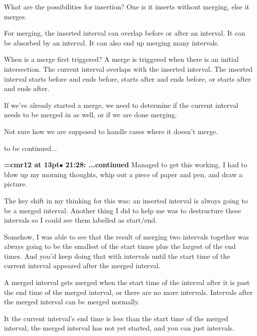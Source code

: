 What are the possibilities for insertion? One is it inserts without merging, else it merges.
\par

For merging, the inserted interval can overlap before or after an interval. It can be absorbed by an interval. It can also end up merging many intervals.
\par

When is a merge first triggered? A merge is triggered when there is an initial intersection. The current interval overlaps with the inserted interval. The inserted interval starts before and ends before, starts after and ends before, or starts after and ends after.
\par

If we've already started a merge, we need to determine if the current interval needs to be merged in as well, or if we are done merging.
\par

Not sure how we are supposed to handle cases where it doesn't merge.
\par

to be continued...
\par

{\smallskip\noindent\bf\font\titlefont=cmr12 at 13pt\titlefont $\bullet$ 21:28: ...continued}\smallskip
Managed to get this working. I had to blow up my morning thoughts, whip out a piece of paper and pen, and draw a picture.
\par

The key shift in my thinking for this was: an inserted interval is always going to be a merged interval. Another thing I did to help me was to destructure these intervals so I could see them labelled as start/end.
\par

Somehow, I was able to see that the result of merging two intervals together was always going to be the smallest of the start times plus the largest of the end times. And you'd keep doing that with intervals until the start time of the current interval appeared after the merged interval.
\par

A merged interval gets merged when the start time of the interval after it is past the end time of the merged interval, or there are no more intervals. Intervals after the merged interval can be merged normally.
\par

It the current interval's end time is less than the start time of the merged interval, the merged interval has not yet started, and you can just intervals.
\par

